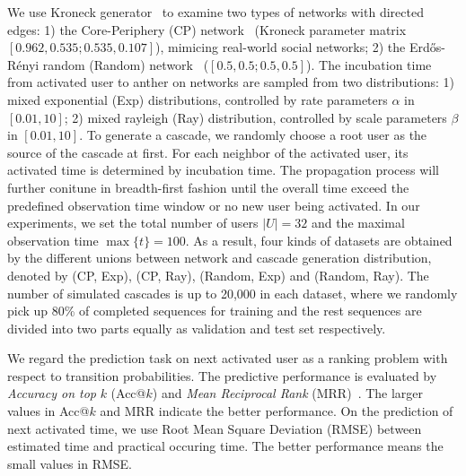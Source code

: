 We use Kroneck
generator~\cite{LeskovecICML07} to examine two types of networks with directed
edges: 1) the Core-Periphery (CP) network~\cite{LeskovecWWW08} (Kroneck
parameter matrix $[0.962, 0.535; 0.535, 0.107]$), mimicing real-world social networks; 2) the
Erd\H{o}s-R{\'e}nyi random (Random) network~\cite{Erdos60} ($[0.5, 0.5; 0.5, 0.5]$). The incubation time
from activated user to anther on networks are sampled from two distributions: 1)
mixed exponential (Exp) distributions, controlled by rate parameters $\alpha$
in $[0.01, 10]$; 2) mixed rayleigh (Ray) distribution, controlled
by scale parameters $\beta$ in $[0.01, 10]$. To generate a
cascade, we randomly choose a root user as the source of the cascade at first.
For each neighbor of the activated user, its activated time is determined by
incubation time. The propagation process will further conitune  in
breadth-first fashion until the overall time exceed the predefined observation
time window or no new user being activated. In our experiments, we set the total
number of users $|U|=32$ and the maximal observation time $\max\{t\}=100$.
As a result, four kinds of datasets are obtained by the different unions between
network and cascade generation distribution, denoted by (CP, Exp), (CP, Ray),
(Random, Exp) and (Random, Ray). The number of simulated cascades is up to
20,000 in each dataset, where we randomly pick up 80\% of completed sequences for training and the rest sequences are
divided into two parts equally as validation and test set respectively. 

We regard the prediction task on next activated user as a ranking problem
with respect to transition probabilities. The predictive performance is
evaluated by \textit{Accuracy on top} $k$ (Acc@$k$) and \textit{Mean Reciprocal Rank}
(MRR)~\cite{voorhees1999trec}.
The larger values in Acc@$k$ and MRR indicate the better performance.
On the prediction of next activated time, we use Root Mean Square Deviation
(RMSE) between estimated time and practical occuring time. The better
performance means the small values in RMSE.   


